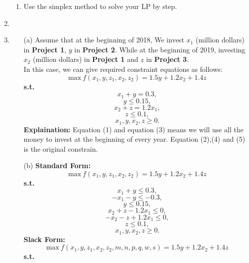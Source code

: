 \documentclass[12pt,a4paper]{article}
\makeatletter
\newtheorem*{solution}{Solution}
\theoremstyle{definition}
\renewenvironment{solution}[1][Solution] {\par\pushQED{\qed}\normalfont\topsep6\p@\@plus6\p@\relax\trivlist\item[\hskip\labelsep\bfseries#1\@addpunct{.}]\ignorespaces}{\popQED\endtrivlist\@endpefalse} \makeatother
\makeatother
\begin{document}
\begin{enumerate}
\begin{enumerate}
    \item
    Use the simplex method to solve your LP by step.
    \end{enumerate}

    \begin{solution}\item
        \renewcommand{\qedsymbol}{}

        \begin{itemize}
        	\item [(a)] Assume that at the beginning of  2018, We invest $x_1$ (million dollars) in \textbf{Project 1}, $y$ in \textbf{Project 2}. While at the beginning of  2019, investing $x_2$ (million dollars) in \textbf{Project 1} and $z$ in \textbf{Project 3}.\\
        	In this case, we can give required constraint equations as follows:\\
          $$\text{max}\ f(x_1,y,z_1,x_2,z_2)=1.5y+1.2x_2+1.4z$$
          \textbf{s.t.}
          \begin{equation}
          x_1+y=0.3,
          \end{equation}
          \begin{equation}
          y \leq 0.15,
          \end{equation}
          \begin{equation}
          x_2+z = 1.2x_1,
          \end{equation}
          \begin{equation}
          z \leq 0.1,
          \end{equation}
          \begin{equation}
          x_1,y,x_2,z \geq 0.
          \end{equation}
          \textbf{Explaination:} Equation (1) and equation (3) means we will use all the money to invest at the beginning of every year. Equation (2),(4) and (5) is the original constrain.
        	\item [(b)] \textbf{Standard Form:}\\
        	$$\text{max}\ f(x_1,y,z_1,x_2,z_2)=1.5y+1.2x_2+1.4z$$
            \textbf{s.t.}
            $$x_1+y \leq 0.3,$$
            $$-x_1-y \leq -0.3,$$
            $$y \leq 0.15,$$
            $$x_2+z-1.2x_1 \leq 0,$$
            $$-x_2-z+1.2x_1 \leq 0,$$
            $$z \leq 0.1,$$
            $$x_1,y,x_2,z \geq 0.$$
          \textbf{Slack Form:}\\
          $$\text{max}\ f(x_1,y,z_1,x_2,z_2,m,n,p,q,w,s)=1.5y+1.2x_2+1.4z$$
            \textbf{s.t.}

\end{itemize}
\end{solution}
\end{enumerate}
\end{document}
